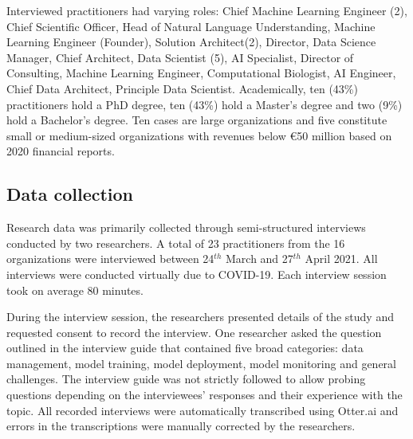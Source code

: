 Interviewed practitioners had varying roles: Chief Machine Learning Engineer (2), Chief Scientific Officer, Head of Natural Language Understanding,  Machine Learning Engineer (Founder), Solution Architect(2), Director, Data Science Manager, Chief Architect, Data Scientist (5), AI Specialist, Director of Consulting, Machine Learning Engineer, Computational Biologist, AI Engineer, Chief Data Architect, Principle Data Scientist.
Academically, ten (43\%) practitioners hold a PhD degree, ten (43\%) hold a Master's degree and two (9\%) hold a Bachelor's degree. %
%
Ten cases are large organizations and five constitute small or medium-sized organizations with revenues below €50 million based on 2020 financial reports\DIFdelbegin {}\DIFdelend .

\subsection{Data collection}

Research data was primarily collected through semi-structured interviews conducted by two researchers. A total of 23 practitioners from the 16 organizations were interviewed between 24$^{th}$ March and 27$^{th}$ April 2021. All interviews were conducted virtually due to COVID-19. Each interview session took on average 80 minutes. 

During the interview session, the researchers presented details of the study and requested consent to record the interview. One researcher asked the question outlined in the interview guide that contained five broad categories: data management, model training, model deployment, model monitoring and general challenges. The interview guide was not strictly followed to allow probing questions depending on the interviewees' responses and their experience with the topic. All recorded interviews were automatically transcribed using Otter.ai and errors in the transcriptions were manually corrected by the researchers.  %

